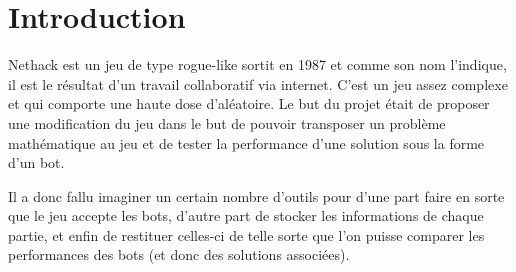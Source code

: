 \chapter*{Introduction}

Nethack est un jeu de type rogue-like sortit en 1987 et comme son nom l'indique, il est le résultat d'un travail collaboratif via internet. C'est un jeu assez complexe et qui comporte une haute dose d'aléatoire. Le but du projet était de proposer une modification du jeu dans le but de pouvoir transposer un problème mathématique au jeu et de tester la performance d'une solution sous la forme d'un bot. 

Il a donc fallu imaginer un certain nombre d'outils pour d'une part faire en sorte que le jeu accepte les bots, d'autre part de stocker les informations de chaque partie, et enfin de restituer celles-ci de telle sorte que l'on puisse comparer les performances des bots (et donc des solutions associées).



